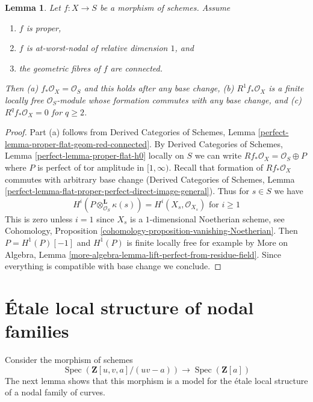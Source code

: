 \documentclass{stacks-project}
\theoremstyle{plain}
\newtheorem{lemma}[subsection]{Lemma}
\theoremstyle{definition}
\theoremstyle{remark}
\numberwithin{equation}{subsection}
\def\Spec{\mathop{\mathrm{Spec}}}
\begin{document}
\begin{lemma}
\label{lemma-genus-in-nodal-family-of-curves}
Let $f : X \to S$ be a morphism of schemes. Assume
\begin{enumerate}
\item $f$ is proper,
\item $f$ is at-worst-nodal of relative dimension $1$, and
\item the geometric fibres of $f$ are connected.
\end{enumerate}
Then (a) $f_*\mathcal{O}_X = \mathcal{O}_S$ and this holds after
any base change, (b) $R^1f_*\mathcal{O}_X$ is a finite locally free
$\mathcal{O}_S$-module whose formation commutes with any base change,
and (c) $R^qf_*\mathcal{O}_X = 0$ for $q \geq 2$.
\end{lemma}

\begin{proof}
Part (a) follows from
Derived Categories of Schemes, Lemma
\ref{perfect-lemma-proper-flat-geom-red-connected}.
By Derived Categories of Schemes, Lemma
\ref{perfect-lemma-proper-flat-h0} locally on $S$
we can write $Rf_*\mathcal{O}_X = \mathcal{O}_S \oplus P$
where $P$ is perfect of tor amplitude in $[1, \infty)$.
Recall that formation of $Rf_*\mathcal{O}_X$ commutes
with arbitrary base change
(Derived Categories of Schemes, Lemma
\ref{perfect-lemma-flat-proper-perfect-direct-image-general}).
Thus for $s \in S$ we have
$$
H^i(P \otimes_{\mathcal{O}_S}^\mathbf{L} \kappa(s)) =
H^i(X_s, \mathcal{O}_{X_s})
\text{ for }i \geq 1
$$
This is zero unless $i = 1$ since $X_s$ is a $1$-dimensional
Noetherian scheme, see
Cohomology, Proposition \ref{cohomology-proposition-vanishing-Noetherian}.
Then $P = H^1(P)[-1]$ and $H^1(P)$ is finite locally free
for example by More on Algebra, Lemma
\ref{more-algebra-lemma-lift-perfect-from-residue-field}.
Since everything is compatible with base change we conclude.
\end{proof}





\section{\'Etale local structure of nodal families}
\label{section-etale-local-nodal}


\noindent
Consider the morphism of schemes
$$
\Spec(\mathbf{Z}[u, v, a]/(uv - a))
\longrightarrow
\Spec(\mathbf{Z}[a])
$$
The next lemma shows that this morphism is a model for
the \'etale local structure of a nodal family of curves.
\end{document}
